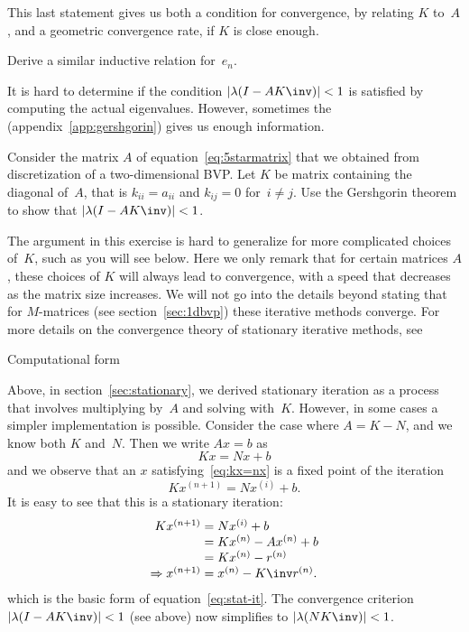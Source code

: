 This last statement gives us both a condition for convergence, by
relating $K$ to~$A$, and a geometric convergence rate, if $K$ is
close enough.

\begin{exercise}
  Derive a similar inductive relation for~$e_n$. 
\end{exercise}

It is hard to determine if the condition $|\lambda(I-AK\inv)|<1$ is
satisfied by computing the actual eigenvalues. However, sometimes the
 (appendix~\ref{app:gershgorin}) gives us enough
information.

\begin{exercise}
  Consider the matrix $A$ of equation~\eqref{eq:5starmatrix} that we
  obtained from discretization of a two-dimensional \ac{BVP}. Let $K$
  be matrix containing the diagonal of~$A$, that is $k_{ii}=a_{ii}$
  and $k_{ij}=0$ for~$i\not=j$. Use the Gershgorin theorem to show
  that $|\lambda(I-AK\inv)|<1$.
\end{exercise}

The argument in this exercise is hard to generalize for more
complicated choices of~$K$, such as you will see below.
Here we only remark that for certain matrices $A$, these choices of
$K$ will always lead to convergence, with a speed that decreases as
the matrix size increases. We will not go into the details beyond
stating that for $M$-matrices (see section~\ref{sec:1dbvp}) these
iterative methods converge. For more details on the convergence theory
of stationary iterative methods, see~\cite{Varga:iterative-analysis}

 {Computational form}
\label{sec:jacobi-seidel}

Above, in section~\ref{sec:stationary}, we derived stationary
iteration as a process that involves multiplying by~$A$ and solving
with~$K$. However, in some cases a simpler implementation is
possible. Consider the case where $A=K-N$, and we know both $K$
and~$N$. Then we write $Ax=b$ as
\begin{equation}
  Kx=Nx+b
  \label{eq:kx=nx}
\end{equation}
and we observe that an $x$ satisfying~\eqref{eq:kx=nx}
is a fixed point of the iteration
\[ Kx^{(n+1)}=Nx^{(i)}+b. \]
It is easy to see that this is a stationary iteration:
\[
\begin{array}{r@{{}={}}l}
  Kx^{(n+1)}&Nx^{(i)}+b\\ &Kx^{(n)}-Ax^{(n)}+b\\ &Kx^{(n)}-r^{(n)}\\
  \Rightarrow x^{(n+1)} & x^{(n)}-K\inv r^{(n)}.
\end{array}
\]
which is the basic form of equation~\eqref{eq:stat-it}.
%
The convergence criterion $|\lambda(I-AK\inv)|<1$ (see
above) now simplifies to
$|\lambda(NK\inv)|<\nobreak1$.

